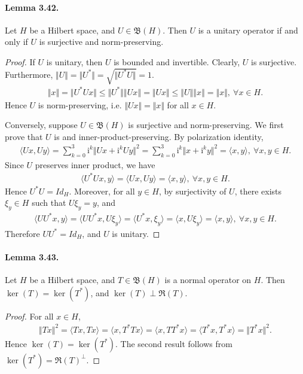 \documentclass{article}
\renewcommand{\i}{\mathrm{i}}
\begin{document}
\paragraph{Lemma 3.42.\label{lemma:3.42}} Let $H$ be a Hilbert space, and $U\in\mathfrak{B}(H)$. Then $U$ is a unitary operator if and only if $U$ is surjective and norm-preserving.
\begin{proof}
If $U$ is unitary, then $U$ is bounded and invertible. Clearly, $U$ is surjective. Furthermore, $\Vert U\Vert = \Vert U^*\Vert = \sqrt{\Vert U^*U\Vert} = 1$.
\begin{align*}
	\Vert x\Vert = \Vert U^*Ux\Vert \leq \Vert U^*\Vert\left\Vert Ux\right\Vert = \Vert Ux\Vert \leq \Vert U\Vert\left\Vert x\right\Vert = \Vert x\Vert,\ \forall x\in H.
\end{align*}
Hence $U$ is norm-preserving, i.e. $\Vert Ux\Vert = \Vert x\Vert$ for all $x\in H$. \vspace{0.1cm}

Conversely, suppose $U\in\mathfrak{B}(H)$ is surjective and norm-preserving. We first prove that $U$ is and inner-product-preserving. By polarization identity,
\begin{align*}
	\langle Ux,Uy\rangle = \sum_{k=0}^3 \i^k\Vert Ux+\i^kUy\Vert^2 = \sum_{k=0}^3 \i^k\Vert x+\i^k y\Vert^2 = \langle x,y\rangle,\ \forall x,y\in H.
\end{align*}
Since $U$ preserves inner product, we have
\begin{align*}
	\langle U^*Ux, y\rangle = \langle Ux, Uy\rangle = \langle x,y\rangle,\ \forall x,y\in H.
\end{align*} 
Hence $U^*U=Id_H$. Moreover, for all $y\in H$, by surjectivity of $U$, there exists $\xi_y\in H$ such that $U\xi_y=y$, and
\begin{align*}
	\langle UU^*x,y\rangle = \langle UU^*x,U\xi_y\rangle = \langle U^*x,\xi_y\rangle = \langle x,U\xi_y\rangle = \langle x,y\rangle,\ \forall x,y\in H. 
\end{align*}
Therefore $UU^*=Id_H$, and $U$ is unitary.
\end{proof}

\paragraph{Lemma 3.43.\label{lemma:3.43}} Let $H$ be a Hilbert space, and $T\in\mathfrak{B}(H)$ is a normal operator on $H$. Then $\ker(T)=\ker(T^*)$, and $\ker(T)\perp\mathfrak{R}(T)$.
\begin{proof}
For all $x\in H$,
\begin{align*}
	\Vert Tx\Vert^2 = \langle Tx,Tx\rangle = \langle x,T^*Tx\rangle = \langle x,TT^*x\rangle = \langle T^*x,T^*x\rangle = \Vert T^*x\Vert^2.
\end{align*}
Hence $\ker(T)=\ker(T^*)$. The second result follows from $\ker(T^*)=\mathfrak{R}(T)^\perp$.
\end{proof}
\end{document}
